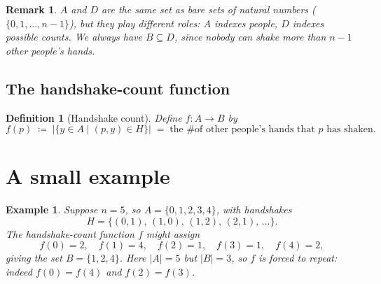 \documentclass[11pt]{article}
\theoremstyle{defstyle}
\newtheorem{definition}{Definition}[section]
\theoremstyle{thmstyle}
\theoremstyle{notstyle}
\newtheorem*{remark}{Remark}
\newtheorem*{example}{Example}
\theoremstyle{cautionstyle}
\newcommand{\hcount}[1]{\bigl|\{y \in A \mid (#1, y) \in H\}\bigr|}
\begin{document}
\begin{notebox}
\begin{remark}
$A$ and $D$ are the \emph{same} set as bare sets of natural numbers
($\{0, 1, \ldots, n-1\}$), but they play different roles: $A$ indexes
people, $D$ indexes possible counts. We always have $B \subseteq D$,
since nobody can shake more than $n - 1$ other people's hands.
\end{remark}
\end{notebox}

\subsection*{The handshake-count function}

\begin{defbox}
\begin{definition}[Handshake count]
Define $f \colon A \to B$ by
\[
  f(p) \;\coloneqq\; \hcount{p}
        \;=\; \text{the \# of other people's hands that } p \text{ has shaken}.
\]
\end{definition}
\end{defbox}

\section{A small example}

\begin{notebox}
\begin{example}
Suppose $n = 5$, so $A = \{0, 1, 2, 3, 4\}$, with handshakes
\[
  H = \{(0,1),\, (1,0),\, (1,2),\, (2,1),\, \ldots\}.
\]
The handshake-count function $f$ might assign
\[
  f(0) = 2,\quad f(1) = 4,\quad f(2) = 1,\quad f(3) = 1,\quad f(4) = 2,
\]
giving the set $B = \{1, 2, 4\}$. Here $|A| = 5$ but $|B| = 3$, so $f$
is forced to repeat: indeed $f(0) = f(4)$ and $f(2) = f(3)$.
\end{example}
\end{notebox}
\end{document}
